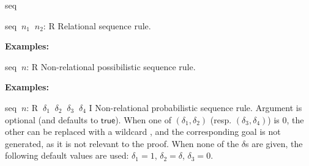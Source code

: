 \begin{tactic}{seq}
  \begin{tsyntax}{seq $\ n_1$ $\ n_2$: R}
  Relational sequence rule.

  \textbf{Examples:}
  \end{tsyntax}

  \begin{tsyntax}{seq $\ n$: R}
  Non-relational possibilistic sequence rule.

  \textbf{Examples:}
  \end{tsyntax}

  \begin{tsyntax}{seq $\ n$: R $\ \delta_1$ $\ \delta_2$ $\ \delta_3$ $\ \delta_4$ I}
  Non-relational probabilistic sequence rule. Argument  is
  optional (and defaults to $\mathsf{true}$). When one of
  $(\delta_1,\delta_2)$ (resp. $(\delta_3,\delta_4)$) is 0, the other
  can be replaced with a wildcard \tct{_}, and the corresponding goal
  is not generated, as it is not relevant to the proof. When none of
  the $\delta$s are given, the following default values are used:
  $\delta_1 = 1$, $\delta_2 = \delta$, $\delta_3 = 0$.


\end{tsyntax}
\end{tactic}
